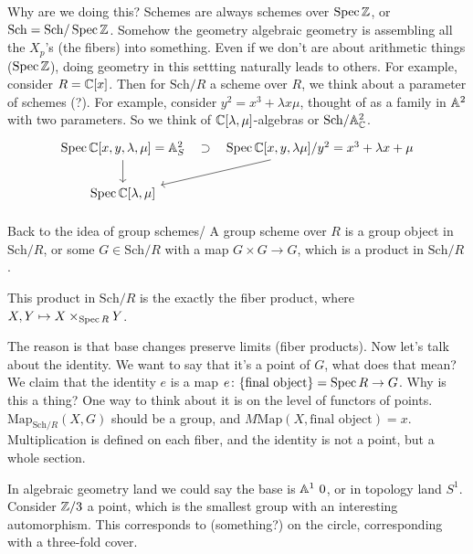 Why are we doing this? Schemes are always schemes over $\operatorname{Spec} \mathbb{Z}$, or $\mathrm{Sch}=\mathrm{Sch} / \operatorname{Spec} \mathbb{Z}$. Somehow the geometry algebraic geometry is assembling all the $X_p$'s (the fibers) into something. Even if we don't are about arithmetic things ($\operatorname{Spec} \mathbb{Z}$), doing geometry in this settting naturally leads to others. For example, consider $R= \mathbb{C}[x]$. Then for $\mathrm{Sch} /R$ a scheme over  $R$, we think about a parameter of schemes (?). For example, consider $y^2 = x^3+ \lambda x  \mu$, thought of as a family in $\mathbb{A}^2$ with two parameters. So we think of $\mathbb{C} [\lambda,\mu]$-algebras or $\mathrm{Sch }/ \mathbb{A}^2 _{\mathbb{C}}$. \[
\begin{tikzcd}
{\Spec \C[x,y,\lambda,\mu ]=\A^2_S} \arrow[d] & {\Spec \C[x,y,\lambda\mu] / y^2=x^3+\lambda x +\mu} \arrow[l, "\supset", phantom] \arrow[ld] \\
{\Spec \underset{}{\C[\lambda,\mu]}}          &                                                                                             
\end{tikzcd}
\] Back to the idea of group schemes/ A group scheme over  $R$ is a group object in $\mathrm{Sch} /R$, or some $G \in \mathrm{Sch} / R$ with a map $G \times G \to G$, which is a product  in $\mathrm{Sch} /R$.
\begin{claim}
    This product in $\mathrm{Sch} / R$ is the exactly the fiber product, where $X,Y \mapsto  X \times _{\operatorname{Spec} R}Y$.
\end{claim}
The reason is that base changes preserve limits (fiber products). Now let's talk about the identity. We want to say that it's a point of $G$, what does that mean? We claim that the identity $e$ is a map $e \colon \{ \text{final object} \} =\operatorname{Spec} R  \to G$. Why is this a thing? One way to think about it is on the level of functors of points. $\mathrm{Map}_{\mathrm{Sch} / R}(X,G)$ should be a group, and $M\mathrm{Map} (X, \text{final object} )= x$. Multiplication is defined on each fiber, and the identity is not a point, but a whole section.

In algebraic geometry land we could say the base is $\mathbb{A}^1 \ 0$, or in topology land $S^1 $. Consider $\mathbb{Z} / 3$ a point, which is the smallest group with an interesting automorphism. This corresponds to (something?) on the circle, corresponding with a three-fold cover.
